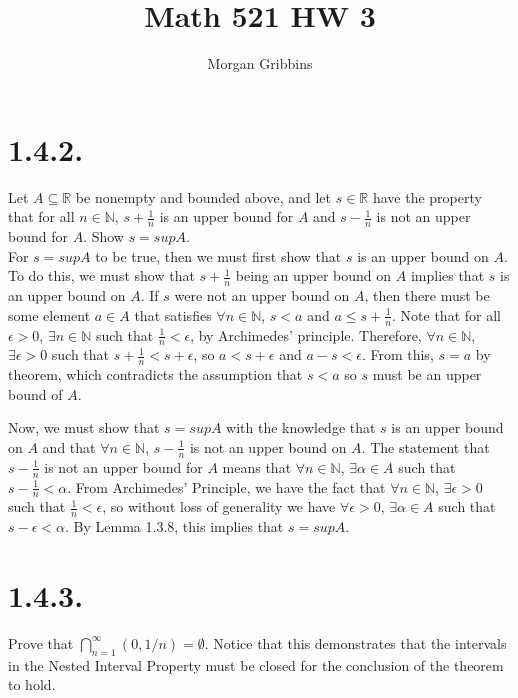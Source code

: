 \documentclass[12pt,letterpaper]{article}
\title{Math 521 HW 3}
\author{Morgan Gribbins}
\begin{document}
	
\maketitle

\section*{1.4.2.}
Let \(A \subseteq \mathbb{R}\) be nonempty and bounded above, and let \(s \in \mathbb{R}\) have the property that for all \(n \in \mathbb{N}\), \(s + \frac{1}{n}\) is an upper bound for \(A\) and \(s - \frac{1}{n}\) is not an upper bound for \(A\). Show \(s=supA\). \\

For \(s=supA\) to be true, then we must first show that \(s\) is an upper bound on \(A\). To do this, we must show that \(s + \frac{1}{n}\) being an upper bound on \(A\) implies that \(s\) is an upper bound on \(A\). If \(s\) were not an upper bound on \(A\), then there must be some element \(a \in A\) that satisfies \(\forall n \in \mathbb{N}\), \(s < a\) and \(a \leq s + \frac{1}{n}\). Note that for all \(\epsilon > 0\), \(\exists n \in \mathbb{N}\) such that \(\frac{1}{n} < \epsilon\), by Archimedes' principle. Therefore, \(\forall n \in \mathbb{N}\), \(\exists \epsilon > 0\) such that \(s + \frac{1}{n} < s + \epsilon\), so \(a < s + \epsilon\) and \(a - s < \epsilon\). From this, \(s = a\) by theorem, which contradicts the assumption that \(s < a\) so \(s\) must be an upper bound of \(A\).

Now, we must show that \(s = supA\) with the knowledge that \(s\) is an upper bound on \(A\) and that \(\forall n \in \mathbb{N}\), \(s - \frac{1}{n}\) is not an upper bound on \(A\). The statement that \(s - \frac{1}{n}\) is not an upper bound for \(A\) means that \(\forall n \in \mathbb{N}\), \(\exists \alpha \in A\) such that \(s - \frac{1}{n} < \alpha\). From Archimedes' Principle, we have the fact that \(\forall n \in \mathbb{N}\), \(\exists \epsilon > 0\) such that \(\frac{1}{n} < \epsilon\), so without loss of generality we have \(\forall \epsilon > 0\), \(\exists \alpha \in A\) such that \(s - \epsilon < \alpha\). By Lemma 1.3.8, this implies that \(s = supA\).

\section*{1.4.3.}
Prove that \(\bigcap_{n=1}^{\infty} (0,1/n)=\emptyset\). Notice that this demonstrates that the intervals in the Nested Interval Property must be closed for the conclusion of the theorem to hold. \\
\end{document}
